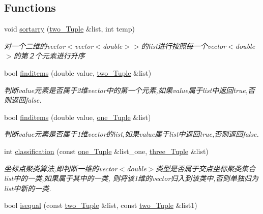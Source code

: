 \subsection*{Functions}
\begin{DoxyCompactItemize}
\item 
void \hyperlink{multiloc_8txt_ae92e2bd9031ed9ed66c58dfffcf01c94}{sortarry} (\hyperlink{multiloc_8txt_a2e41d128befae015727cbf20484696a9}{two\+\_\+\+Tuple} \&list, int temp)
\begin{DoxyCompactList}\small\item\em 对一个二维的vector$<$vector$<$double$>$$>$的list进行按照每一个vector$<$double$>$的第２个元素进行升序 \end{DoxyCompactList}\item 
bool \hyperlink{multiloc_8txt_ac6173a0dbaef919c983aba0501486521}{finditems} (double value, \hyperlink{multiloc_8txt_a2e41d128befae015727cbf20484696a9}{two\+\_\+\+Tuple} \&list)
\begin{DoxyCompactList}\small\item\em 判断value元素是否属于2维vector中的第一个元素,如果value属于list中返回true,否则返回false. \end{DoxyCompactList}\item 
bool \hyperlink{multiloc_8txt_ace45908ac4ee480fb56d3c9c75307948}{finditems} (double value, \hyperlink{multiloc_8txt_a490e31016ad1c0d99b23e323d64e3aac}{one\+\_\+\+Tuple} \&list)
\begin{DoxyCompactList}\small\item\em 判断value元素是否属于1维vector的list,如果value属于list中返回true,否则返回false. \end{DoxyCompactList}\item 
int \hyperlink{multiloc_8txt_aadf97ca572984448ec65bf16dc482624}{classification} (const \hyperlink{multiloc_8txt_a490e31016ad1c0d99b23e323d64e3aac}{one\+\_\+\+Tuple} \&list\+\_\+one, \hyperlink{multiloc_8txt_aa614d5a3aa93583e717bf9a9c9b6627b}{three\+\_\+\+Tuple} \&list)
\begin{DoxyCompactList}\small\item\em 坐标点聚类算法,即判断一维的vector$<$double$>$类型是否属于交点坐标聚类集合list中的一类,如果属于其中的一类, 则将该1维的vector归入到该类中,否则单独归为list中新的一类. \end{DoxyCompactList}\item 
bool \hyperlink{multiloc_8txt_af88db23dcdf52a0dd28d82133903945d}{isequal} (const \hyperlink{multiloc_8txt_a2e41d128befae015727cbf20484696a9}{two\+\_\+\+Tuple} \&list, const \hyperlink{multiloc_8txt_a2e41d128befae015727cbf20484696a9}{two\+\_\+\+Tuple} \&list1)

\end{DoxyCompactItemize}

